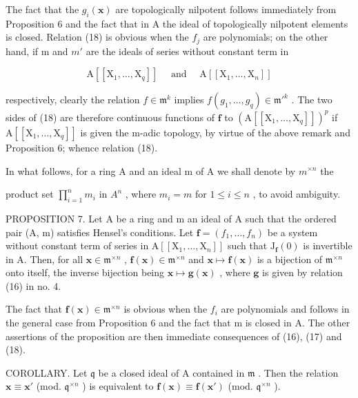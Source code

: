 The fact that the \(g_{i}(\mathbf{x})\) are topologically nilpotent follows immediately from Proposition 6 and the fact that in A the ideal of topologically nilpotent elements is closed. Relation (18) is obvious when the \(f_{j}\) are polynomials; on the other hand, if m and \(m'\) are the ideals of series without constant term in

\[
\mathrm{A} \left[ \left[ \mathrm{X} _ {1}, \dots , \mathrm{X} _ {q} \right] \right] \quad \text { and } \quad \mathrm{A} \left[ \left[ \mathrm{X} _ {1}, \dots , \mathrm{X} _ {n} \right] \right]
\]

respectively, clearly the relation \(f \in \mathfrak{m}^k\) implies \(f(g_1, \ldots, g_q) \in \mathfrak{m}'^k\) . The two sides of (18) are therefore continuous functions of \(\mathbf{f}\) to \((\mathrm{A}[[\mathrm{X}_1, \ldots, \mathrm{X}_q]])^p\) if \(\mathrm{A}[[\mathrm{X}_1, \ldots, \mathrm{X}_q]]\) is given the m-adic topology, by virtue of the above remark and Proposition 6; whence relation (18).

In what follows, for a ring A and an ideal m of A we shall denote by \(m^{\times n}\) the

product set \(\prod_{i=1}^{n} m_i\) in \(A^n\) , where \(m_i = m\) for \(1 \leqslant i \leqslant n\) , to avoid ambiguity.

PROPOSITION 7. Let A be a ring and m an ideal of A such that the ordered pair (A, m) satisfies Hensel's conditions. Let \(\mathbf{f} = (f_1, \ldots, f_n)\) be a system without constant term of series in \(\mathrm{A}[[\mathrm{X}_1, \ldots, \mathrm{X}_n]]\) such that \(\mathrm{J}_{\mathbf{f}}(0)\) is invertible in A. Then, for all \(\mathbf{x} \in \mathfrak{m}^{\times n}\) , \(\mathbf{f}(\mathbf{x}) \in \mathfrak{m}^{\times n}\) and \(\mathbf{x} \mapsto \mathbf{f}(\mathbf{x})\) is a bijection of \(\mathfrak{m}^{\times n}\) onto itself, the inverse bijection being \(\mathbf{x} \mapsto \mathbf{g}(\mathbf{x})\) , where \(\mathbf{g}\) is given by relation (16) in no. 4.

The fact that \(\mathbf{f}(\mathbf{x})\in\mathfrak{m}^{\times n}\) is obvious when the \(f_{i}\) are polynomials and follows in the general case from Proposition 6 and the fact that m is closed in A. The other assertions of the proposition are then immediate consequences of (16), (17) and (18).

COROLLARY. Let \(\mathfrak{q}\) be a closed ideal of A contained in \(\mathfrak{m}\) . Then the relation \(\mathbf{x} \equiv \mathbf{x}'\) (mod. \(\mathfrak{q}^{\times n}\) ) is equivalent to \(\mathbf{f}(\mathbf{x}) \equiv \mathbf{f}(\mathbf{x}')\) (mod. \(\mathfrak{q}^{\times n}\) ).

